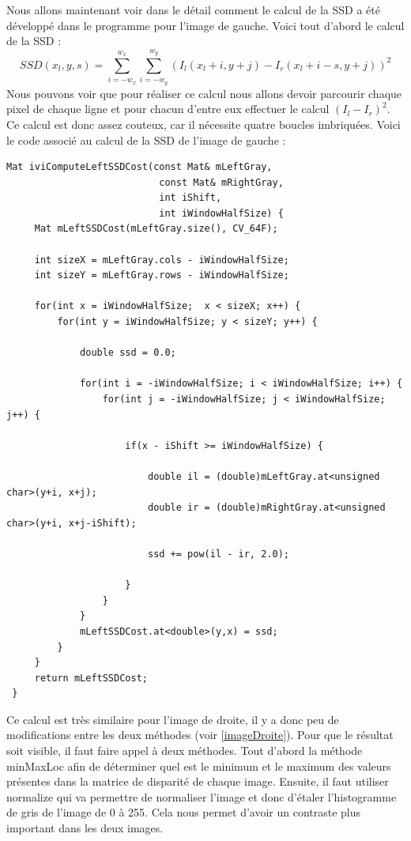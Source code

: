\documentclass[a4paper,10pt]{article}
\begin{document}
Nous allons maintenant voir dans le détail comment le calcul de la SSD a été développé
dans le programme pour l'image de gauche. Voici tout d'abord le calcul de la SSD :
\begin{equation}
 SSD(x_l,y,s)=\sum_{i=-w_x}^{w_x}\sum_{i=-w_y}^{w_y}(I_l(x_l+i,y+j)-I_r(x_l+i-s,y+j))^2
\end{equation}
Nous pouvons voir que pour réaliser ce calcul nous allons devoir parcourir chaque pixel
de chaque ligne et pour chacun d'entre eux effectuer le calcul $(I_l-I_r)^2$. Ce calcul
est donc assez couteux, car il nécessite quatre boucles imbriquées. Voici le code associé
au calcul de la SSD de l'image de gauche :
\begin{lstlisting}[caption=Calcul de la SSD pour l'image gauche]
Mat iviComputeLeftSSDCost(const Mat& mLeftGray,
                           const Mat& mRightGray,
                           int iShift,
                           int iWindowHalfSize) {
     Mat mLeftSSDCost(mLeftGray.size(), CV_64F);

     int sizeX = mLeftGray.cols - iWindowHalfSize;
     int sizeY = mLeftGray.rows - iWindowHalfSize;
 
     for(int x = iWindowHalfSize;  x < sizeX; x++) {
         for(int y = iWindowHalfSize; y < sizeY; y++) {
 
             double ssd = 0.0;
 
             for(int i = -iWindowHalfSize; i < iWindowHalfSize; i++) {
                 for(int j = -iWindowHalfSize; j < iWindowHalfSize; j++) {
 
                     if(x - iShift >= iWindowHalfSize) {
 
                         double il = (double)mLeftGray.at<unsigned char>(y+i, x+j);
                         double ir = (double)mRightGray.at<unsigned char>(y+i, x+j-iShift);
 
                         ssd += pow(il - ir, 2.0);
 
                     }
                 }
             }
             mLeftSSDCost.at<double>(y,x) = ssd;
         }
     }
     return mLeftSSDCost;
 }
\end{lstlisting}
Ce calcul est très similaire pour l'image de droite, il y a donc peu de modifications entre
les deux méthodes (voir \ref{imageDroite}). Pour que le résultat soit visible, il faut faire
appel à deux méthodes. Tout d'abord la méthode minMaxLoc afin de déterminer quel est le 
minimum et le maximum des valeurs présentes dans la matrice de disparité de chaque image.
Ensuite, il faut utiliser normalize qui va permettre de normaliser l'image et donc d'étaler
l'histogramme de gris de l'image de 0 à 255. Cela nous permet d'avoir un contraste plus 
important dans les deux images.\\
\end{document}
